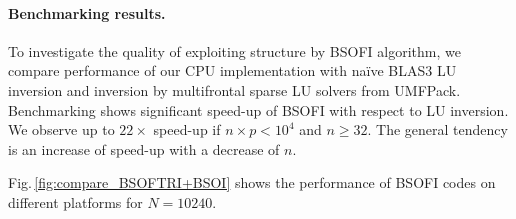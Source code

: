 \documentclass{llncs}
\begin{document}
    \paragraph{Benchmarking results.}
    \label{sec:benchmarking}

    To investigate the quality of exploiting structure by BSOFI algorithm,
    we compare performance of our 
    CPU implementation with na\"ive BLAS3 LU inversion 
    and inversion by multifrontal sparse LU solvers from {\sc UMFPack}. 
    Benchmarking shows 
    significant speed-up of BSOFI with respect to LU inversion.
    We observe up to $22\times$ speed-up if $n\times p < 10^4$ and $n \ge 32$. 
    The general tendency is an increase of speed-up with a decrease of $n$.

    Fig.\,\ref{fig:compare_BSOFTRI+BSOI} shows the performance of 
    BSOFI codes on different platforms for $N=10240$.
\end{document}
